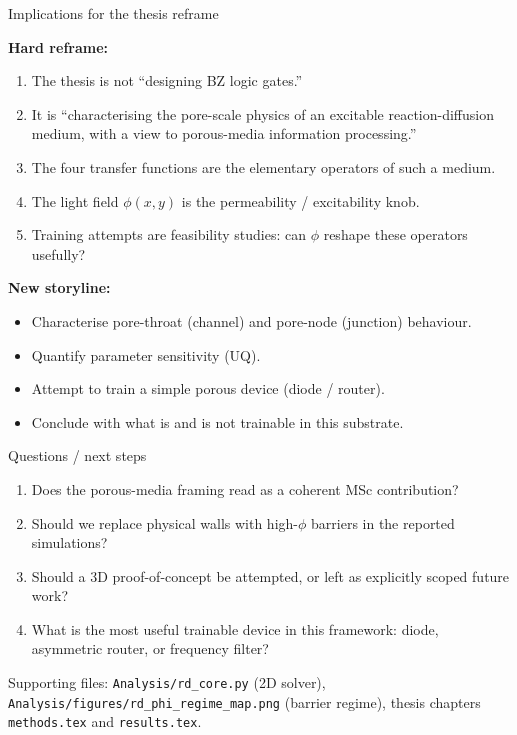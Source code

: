 \documentclass[aspectratio=169,11pt]{beamer}
\begin{document}
\begin{frame}{Implications for the thesis reframe}

\textbf{Hard reframe:}
\begin{enumerate}
    \item The thesis is not ``designing BZ logic gates.''
    \item It is ``characterising the pore-scale physics of an excitable reaction-diffusion medium, with a view to porous-media information processing.''
    \item The four transfer functions are the elementary operators of such a medium.
    \item The light field $\phi(x,y)$ is the permeability / excitability knob.
    \item Training attempts are feasibility studies: can $\phi$ reshape these operators usefully?
\end{enumerate}

\vspace{0.3cm}
\textbf{New storyline:}
\begin{itemize}
    \item Characterise pore-throat (channel) and pore-node (junction) behaviour.
    \item Quantify parameter sensitivity (UQ).
    \item Attempt to train a simple porous device (diode / router).
    \item Conclude with what is and is not trainable in this substrate.
\end{itemize}

\end{frame}

\begin{frame}{Questions / next steps}

\begin{enumerate}
    \item Does the porous-media framing read as a coherent MSc contribution?
    \item Should we replace physical walls with high-$\phi$ barriers in the reported simulations?
    \item Should a 3D proof-of-concept be attempted, or left as explicitly scoped future work?
    \item What is the most useful trainable device in this framework: diode, asymmetric router, or frequency filter?
\end{enumerate}

\vspace{0.4cm}
{\small Supporting files: \texttt{Analysis/rd\_core.py} (2D solver), \texttt{Analysis/figures/rd\_phi\_regime\_map.png} (barrier regime), thesis chapters \texttt{methods.tex} and \texttt{results.tex}.}

\end{frame}
\end{document}
